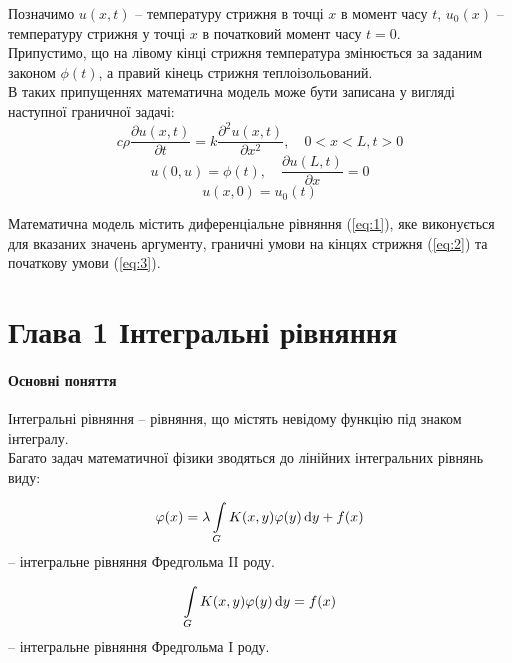 Позначимо $u(x, t)$ -- температуру стрижня в точці $x$ в момент часу $t$, $u_0(x)$ -- температуру стрижня у точці $x$ в початковий момент часу $t = 0$. \\

Припустимо, що на лівому кінці стрижня температура змінюється за заданим законом $\phi(t)$, а правий кінець стрижня теплоізольований. \\

В таких припущеннях математична модель може бути записана у вигляді наступної граничної задачі:
\begin{equation}
	\label{eq:1}
	c \rho \dfrac{\partial u(x, t)}{\partial t} = k \dfrac{\partial^2 u(x, t)}{\partial x^2}, \quad 0 < x < L, t > 0
\end{equation}
\begin{equation}
	\label{eq:2}
	u(0, u) = \phi(t), \quad  \dfrac{\partial u(L, t)}{\partial x} = 0
\end{equation}
\begin{equation}
	\label{eq:3}
	u(x, 0) = u_0(t)
\end{equation}

Математична модель містить диференціальне рівняння (\ref{eq:1}), яке виконується для вказаних значень аргументу, граничні умови на кінцях стрижня (\ref{eq:2}) та початкову умови (\ref{eq:3}).

\chapter*{Глава 1 Інтегральні рівняння}

\subsubsection*{Основні поняття}

Інтегральні рівняння -- рівняння, що містять невідому функцію під знаком інтегралу. \\

Багато задач математичної фізики зводяться до лінійних інтегральних рівнянь виду:

\begin{equation}
	\label{eq:*.1}
	\varphi(x) = \lambda \displaystyle\int\limits_G K(x, y) \varphi(y) \mathop{}\!\mathrm{d} y + f(x)
\end{equation}
-- інтегральне рівняння Фредгольма II роду.

\begin{equation}
	\label{eq:*.2}
	\displaystyle\int\limits_G K(x, y) \varphi(y) \mathop{}\!\mathrm{d} y = f(x)
\end{equation}
-- інтегральне рівняння Фредгольма I роду. \\

